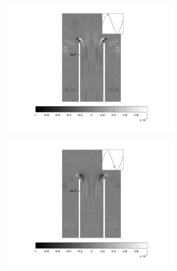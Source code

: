 \begin{landscape}
\begin{figure}[ht!]
\begin{subfigure}{0.55 \textwidth}
  \includegraphics[width=1.\linewidth]{figuras/min_ka_007_3.png}
  \caption[]{}
  \label{fig:min_007_3}
\end{subfigure}
\par\medskip
\begin{subfigure}{0.55 \textwidth}
  \includegraphics[width=1.\linewidth]{figuras/min_ka_007_4.png}
  \caption[]{}
  \label{fig:min_007_4}
\end{subfigure}
\begin{subfigure}{0.55 \textwidth}

\end{subfigure}
\end{figure}
\end{landscape}

